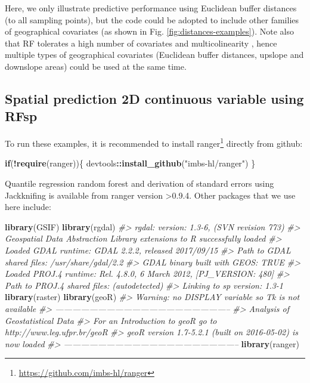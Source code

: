 \documentclass[graybox,natbib,nospthms,UStrade]{svmono}
\newenvironment{Shaded}{\begin{snugshade}}{\end{snugshade}}
\newcommand{\CommentTok}[1]{\textcolor[rgb]{0.37,0.37,0.37}{\textit{#1}}}
\newcommand{\ControlFlowTok}[1]{\textcolor[rgb]{0.27,0.27,0.27}{\textbf{#1}}}
\newcommand{\KeywordTok}[1]{\textcolor[rgb]{0.27,0.27,0.27}{\textbf{#1}}}
\newcommand{\NormalTok}[1]{#1}
\newcommand{\OperatorTok}[1]{\textcolor[rgb]{0.43,0.43,0.43}{\textbf{#1}}}
\newcommand{\StringTok}[1]{\textcolor[rgb]{0.5,0.5,0.5}{#1}}
\renewcommand{\href}[2]{#2 (\url{#1})}
\renewcommand{\href}[2]{#2\footnote{\url{#1}}}
\begin{document}
Here, we only illustrate predictive performance using Euclidean buffer distances
(to all sampling points), but the code could be adopted to
include other families of geographical covariates (as shown in
Fig. \ref{fig:distances-examples}). Note also that RF tolerates a high
number of covariates and multicolinearity \citep{Biau2016}, hence multiple
types of geographical covariates (Euclidean buffer distances, upslope
and downslope areas) could be used at the same time.

\hypertarget{spatial-prediction-2d-continuous-variable-using-rfsp}{%
\subsection{Spatial prediction 2D continuous variable using RFsp}\label{spatial-prediction-2d-continuous-variable-using-rfsp}}

To run these examples, it is recommended to install \href{https://github.com/imbs-hl/ranger}{ranger} \citep{wright2017ranger} directly from github:

\begin{Shaded}
\begin{Highlighting}[]
\ControlFlowTok{if}\NormalTok{(}\OperatorTok{!}\KeywordTok{require}\NormalTok{(ranger))\{ devtools}\OperatorTok{::}\KeywordTok{install_github}\NormalTok{(}\StringTok{"imbs-hl/ranger"}\NormalTok{) \}}
\end{Highlighting}
\end{Shaded}

Quantile regression random forest and derivation of standard errors using Jackknifing is available from ranger version \textgreater{}0.9.4. Other packages that we use here include:

\begin{Shaded}
\begin{Highlighting}[]
\KeywordTok{library}\NormalTok{(GSIF)}
\KeywordTok{library}\NormalTok{(rgdal)}
\CommentTok{#> rgdal: version: 1.3-6, (SVN revision 773)}
\CommentTok{#>  Geospatial Data Abstraction Library extensions to R successfully loaded}
\CommentTok{#>  Loaded GDAL runtime: GDAL 2.2.2, released 2017/09/15}
\CommentTok{#>  Path to GDAL shared files: /usr/share/gdal/2.2}
\CommentTok{#>  GDAL binary built with GEOS: TRUE }
\CommentTok{#>  Loaded PROJ.4 runtime: Rel. 4.8.0, 6 March 2012, [PJ_VERSION: 480]}
\CommentTok{#>  Path to PROJ.4 shared files: (autodetected)}
\CommentTok{#>  Linking to sp version: 1.3-1}
\KeywordTok{library}\NormalTok{(raster)}
\KeywordTok{library}\NormalTok{(geoR)}
\CommentTok{#> Warning: no DISPLAY variable so Tk is not available}
\CommentTok{#> --------------------------------------------------------------}
\CommentTok{#>  Analysis of Geostatistical Data}
\CommentTok{#>  For an Introduction to geoR go to http://www.leg.ufpr.br/geoR}
\CommentTok{#>  geoR version 1.7-5.2.1 (built on 2016-05-02) is now loaded}
\CommentTok{#> --------------------------------------------------------------}
\KeywordTok{library}\NormalTok{(ranger)}
\end{Highlighting}
\end{Shaded}
\end{document}
